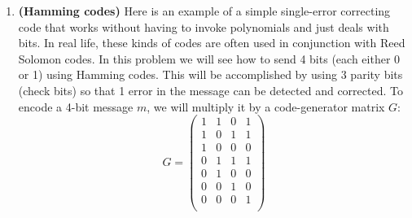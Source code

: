 \documentclass[11pt]{article}
\begin{document}
\begin{enumerate}
\begin{enumerate}
\end{enumerate}


%
%



\item {\bf (Hamming codes)} Here is an example of a simple single-error correcting code that works without having to invoke polynomials and just deals with bits. In real life, these kinds of codes are often used in conjunction with Reed Solomon codes. In this problem we will see how to send 4 bits (each either 0 or 1) using Hamming codes. This will be accomplished by using 3 parity bits (check bits) so that 1 error in the message can be detected and corrected. To encode a 4-bit message $m$, we will multiply it by a code-generator matrix $G$:
\[ G = \left( \begin{array}{cccc} 1 & 1 & 0 & 1 \\
1 & 0 & 1 & 1 \\
1 & 0 & 0 & 0 \\
0 & 1 & 1 & 1 \\
0 & 1 & 0 & 0 \\
0 & 0 & 1 & 0 \\
0 & 0 & 0 & 1 \\
\end{array} \right)
\]   


\end{enumerate}
\end{document}

